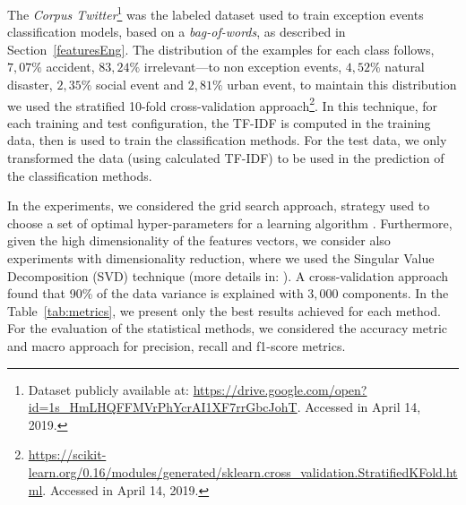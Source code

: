\documentclass[runningheads]{llncs}
\begin{document}
\label{Experiments_Corpus_Twitter}
The \textit{Corpus Twitter}\footnote{Dataset publicly available at: \url{https://drive.google.com/open?id=1s_HmLHQFFMVrPhYcrAI1XF7rrGbcJohT}. Accessed in April 14, 2019.} was the labeled dataset used to train exception events classification models, based on a \textit{bag-of-words}, as described in Section~\ref{featuresEng}. %
The distribution of the examples for each class follows, $7,07\%$ accident, $83,24\%$ irrelevant---to non exception events, $4,52\%$ natural disaster, $2,35\%$ social event and $2,81\%$ urban event, to maintain this distribution we used the stratified 10-fold cross-validation approach\footnote{\url{https://scikit-learn.org/0.16/modules/generated/sklearn.cross_validation.StratifiedKFold.html}. Accessed in April 14, 2019.}. In this technique, for each training and test configuration, the TF-IDF is computed in the training data, then is used to train the classification methods. For the test data, we only transformed  the data (using calculated TF-IDF) to be used in the prediction of the classification methods.



In the experiments, we considered the grid search approach, strategy used to choose a set of optimal hyper-parameters for a learning algorithm \cite{james2013introduction}.  Furthermore, given the high dimensionality of the features vectors, we consider also experiments with dimensionality reduction, where we used the Singular Value Decomposition (SVD) technique (more details in: \cite{zhang2011comparative}). A cross-validation approach found that 90\% of the data variance is explained with $3,000$ components. In the Table~\ref{tab:metrics}, we present only the best results achieved for each method. For the evaluation of the statistical methods, we considered the accuracy metric and macro approach for precision, recall and f1-score metrics.

	
\end{document}
